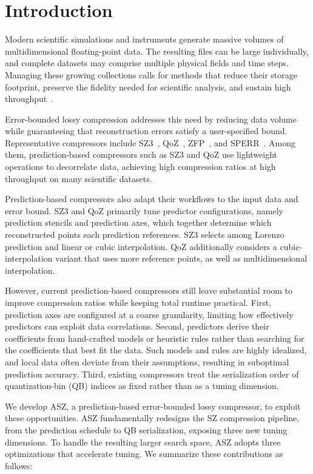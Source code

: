 \section{Introduction}
\label{sec:introduction}

Modern scientific simulations and instruments generate massive volumes of multidimensional floating-point data. The resulting files can be large individually, and complete datasets may comprise multiple physical fields and time steps. Managing these growing collections calls for methods that reduce their storage footprint, preserve the fidelity needed for scientific analysis, and sustain high throughput~\cite{cappello2019use,di2025survey,cappello2025support}.

Error-bounded lossy compression addresses this need by reducing data volume while guaranteeing that reconstruction errors satisfy a user-specified bound. Representative compressors include SZ3~\cite{zhao2021optimizing,liang2022sz3}, QoZ~\cite{liu2022dynamic,liu2024high}, ZFP~\cite{lindstrom2014fixed}, and SPERR~\cite{li2023lossy}. Among them, prediction-based compressors such as SZ3 and QoZ use lightweight operations to decorrelate data, achieving high compression ratios at high throughput on many scientific datasets.

Prediction-based compressors also adapt their workflows to the input data and error bound. SZ3 and QoZ primarily tune predictor configurations, namely prediction stencils and prediction axes, which together determine which reconstructed points each prediction references. SZ3 selects among Lorenzo prediction and linear or cubic interpolation. QoZ additionally considers a cubic-interpolation variant that uses more reference points, as well as multidimensional interpolation.

However, current prediction-based compressors still leave substantial room to improve compression ratios while keeping total runtime practical. First, prediction axes are configured at a coarse granularity, limiting how effectively predictors can exploit data correlations. Second, predictors derive their coefficients from hand-crafted models or heuristic rules rather than searching for the coefficients that best fit the data. Such models and rules are highly idealized, and local data often deviate from their assumptions, resulting in suboptimal prediction accuracy. Third, existing compressors treat the serialization order of quantization-bin (QB) indices as fixed rather than as a tuning dimension.

We develop ASZ, a prediction-based error-bounded lossy compressor, to exploit these opportunities. ASZ fundamentally redesigns the SZ compression pipeline, from the prediction schedule to QB serialization, exposing three new tuning dimensions. To handle the resulting larger search space, ASZ adopts three optimizations that accelerate tuning. We summarize these contributions as follows:

